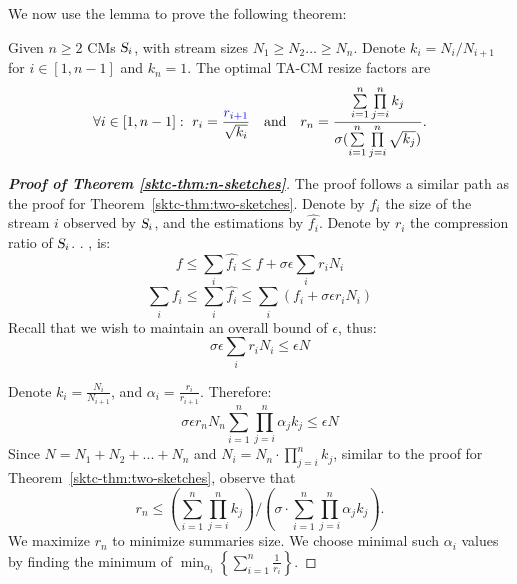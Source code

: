 We now use the lemma to prove the following theorem:
\begin{theorem}
Given $n \geq 2$ CMs $\textsl{S}_i$, with stream sizes $N_1 \ge N_2 \ldots \ge N_n$. Denote $k_i=N_i/N_{i+1}$ for $i \in [1,n-1]$ and $k_n = 1$.
The optimal TA-CM resize factors are \[
\forall i \in [1,n-1]: \ r_i = \frac{{\color{blue}{r_{i+1}}}}{\sqrt{k_i}}
\quad  \text{and} \quad  
r_n = \frac{\sum\limits_{i=1}^n \prod\limits_{j=i}^n k_j}{\sigma(\sum\limits_{i=1}^n {\prod\limits_{j=i}^n \sqrt{k_j})}}.\]
\label{sktc-thm:n-sketches}
\end{theorem}

\begin{proof}[\textbf{Proof of Theorem \ref{sktc-thm:n-sketches}}]
The proof follows a similar path as the proof for Theorem~\ref{sktc-thm:two-sketches}. Denote by $f_i$ the size of the stream $i$ observed by $\textsl{S}_i$, and the estimations by $\hat{f_i}$. Denote by $r_i$ the compression ratio of $\textsl{S}_i$. . , is:
\[ f \leq \sum_i \hat{f_i} \leq f + \sigma \epsilon \sum_i r_i N_i \]
\[ \sum_i f_i \leq \sum_i \hat{f_i} \leq \sum_i \left(f_i + \sigma \epsilon r_i N_i\right) \]
Recall that we wish to maintain an overall bound of $\epsilon$, thus:
\[\sigma \epsilon \sum_i r_i N_i \leq \epsilon N\]

Denote $k_i = \frac{N_i}{N_{i+1}}$, and $\alpha_i=\frac{r_i}{r_{i+1}}$. Therefore:
\[\sigma \epsilon r_n N_n \sum\limits_{i=1}^{n} \prod\limits_{j=i}^n \alpha_j k_j  \leq \epsilon N \]
Since $N = N_1+N_2+...+N_n$ and $N_i = N_n \cdot \prod\limits_{j=i}^n k_j $, similar to the proof for Theorem~\ref{sktc-thm:two-sketches}, observe that
\[ r_n \leq \left(\sum\limits_{i=1}^{n} \prod\limits_{j=i}^n k_j\right) / \left(\sigma \cdot \sum\limits_{i=1}^{n} \prod\limits_{j=i}^n \alpha_j k_j\right).\]
We maximize $r_n$ to minimize summaries size. We choose minimal such $\alpha_i$ values by finding the minimum of 
$\min_{\alpha_i} \left\{\sum_{i=1}^n \frac{1}{r_i} \right\}$. 



\end{proof}
